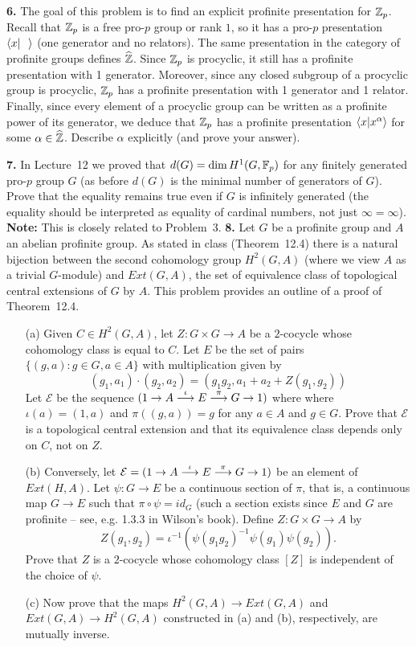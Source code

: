 \documentclass[12pt]{amsart}
\begin{document}
\skv
{\bf 6.} The goal of this problem is to find an explicit profinite presentation for ${\mathbb Z}_p$.
Recall that ${\mathbb Z}_p$ is a free pro-$p$ group or rank $1$, so it has a pro-$p$ presentation ${\langle} x |\,\,\,\, {\rangle}$ (one generator and no relators). The same presentation in the category of profinite groups defines $\widehat{{\mathbb Z}}$. Since ${\mathbb Z}_p$ is procyclic,
it still has a profinite presentation with 1 generator. Moreover, since any closed subgroup of a procyclic group is procyclic,
${\mathbb Z}_p$ has a profinite presentation with 1 generator and 1 relator. Finally, since every element of a procyclic group can be written as a profinite power of its generator, we deduce that ${\mathbb Z}_p$ has a profinite presentation ${\langle} x | x^{\alpha}{\rangle}$
for some $\alpha\in\widehat{{\mathbb Z}}$. Describe $\alpha$ explicitly (and prove your answer).
\skv

{\bf 7.} In Lecture~12 we proved that $d(G)=\dim H^1(G,{\mathbb F}_p)$ for any finitely generated pro-$p$ group $G$ (as before $d(G)$
is the minimal number of generators of $G$). Prove that the equality remains true even if $G$ is infinitely generated (the equality should be interpreted as equality of cardinal numbers, not just $\infty=\infty$). {\bf Note:} This is closely related to Problem~3.
\skv
{\bf 8.} Let $G$ be a profinite group and $A$ an abelian profinite group. As stated in class (Theorem~12.4) there is a natural bijection between the second cohomology group $H^2(G,A)$ (where we view $A$ as a trivial $G$-module) and $Ext(G,A)$, the set of
equivalence class of topological central extensions of $G$ by $A$. This problem provides an outline of a proof of Theorem~12.4.

\begin{itemize}
\item[(a)] Given $C\in H^2(G,A)$, let $Z:G\times G\to A$ be a $2$-cocycle whose cohomology
class is equal to $C$. Let $E$ be the set of pairs $\{(g,a): g\in G, a\in A\}$
with multiplication given by 
\begin{equation}
\label{eq:cocycle}
(g_1,a_1)\cdot (g_2,a_2)=(g_1 g_2, a_1+a_2+Z(g_1,g_2))
\end{equation}
Let $\mathcal E$ be the sequence $(1\to A\stackrel{\iota}{\longrightarrow} E\stackrel{\pi}{\longrightarrow}G\to 1)$ where
where $\iota(a)=(1,a)$ and $\pi((g,a))=g$ for any $a\in A$ and $g\in G$.
Prove that $\mathcal E$ is a topological central extension and that its equivalence class depends only on $C$, not on $Z$.

\item[(b)] Conversely, let 
$\mathcal E= (1\to A\stackrel{\iota}{\longrightarrow}E\stackrel{\pi}{\longrightarrow}G\to 1)$
be an element of $Ext(H,A)$. Let $\psi: G\to E$ be a continuous section of $\pi$, 
that is, a continuous map $G\to E$ such that $\pi\circ\psi=id_G$
(such a section exists since $E$ and $G$ are profinite -- see, e.g. 1.3.3 in Wilson's book). 
Define $Z:G\times G\to A$ by $$Z(g_1,g_2)=\iota^{-1}(\psi(g_1 g_2)^{-1}\psi(g_1)\psi(g_2)).$$
Prove that $Z$ is a $2$-cocycle whose cohomology class $[Z]$ is independent of the choice of $\psi$.

\item[(c)] Now prove that the maps $H^2(G,A)\to Ext(G,A)$ and $Ext(G,A)\to H^2(G,A)$ constructed in (a) and (b), respectively,
are mutually inverse.
\end{itemize}
\end{document}
